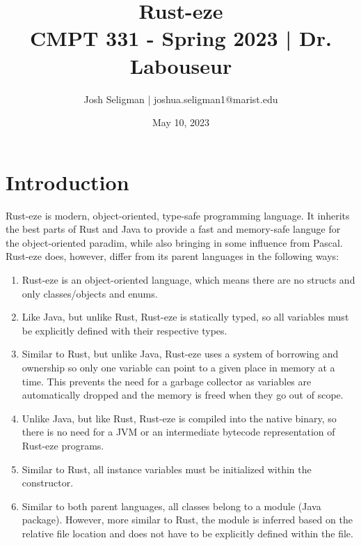 \documentclass[letterpaper, 10pt, DIV=13]{scrartcl}
\title {
	\normalfont
	\huge{Rust-eze} \\
	\vspace{10pt}
	\large{CMPT 331 - Spring 2023 | Dr. Labouseur}
}
\author{\normalfont Josh Seligman | joshua.seligman1@marist.edu}
\date{\normalfont May 10, 2023}
\numberwithin{equation}{section}
\numberwithin{figure}{section}
\numberwithin{table}{section}
\begin{document}
\maketitle
\newpage

\section{Introduction}
Rust-eze is modern, object-oriented, type-safe programming language. It inherits
the best parts of Rust and Java to provide a fast and memory-safe languge for
the object-oriented paradim, while also bringing in some influence from Pascal.
Rust-eze does, however, differ from its parent languages in the following ways:
\begin{enumerate}
    \item Rust-eze is an object-oriented language, which means there are no
          structs and only classes/objects and enums.
    \item Like Java, but unlike Rust, Rust-eze is statically typed, so all
          variables must be explicitly defined with their respective types.
    \item Similar to Rust, but unlike Java, Rust-eze uses a system of borrowing
          and ownership so only one variable can point to a given place in
          memory at a time. This prevents the need for a garbage collector as
          variables are automatically dropped and the memory is freed when they
          go out of scope.
    \item Unlike Java, but like Rust, Rust-eze is compiled into the native
          binary, so there is no need for a JVM or an intermediate bytecode
          representation of Rust-eze programs.
    \item Similar to Rust, all instance variables must be initialized within the
          constructor.
    \item Similar to both parent languages, all classes belong to a module
          (Java package). However, more similar to Rust, the module is inferred
          based on the relative file location and does not have to be explicitly
          defined within the file.
\end{enumerate}

\newpage
\end{document}
